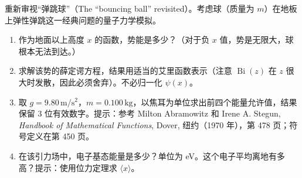 \begin{question}
重新审视“弹跳球”（The ``bouncing ball'' revisited）。考虑球（质量为 $m$）在地板上弹性弹跳这一经典问题的量子力学模拟。
\begin{enumerate}
\item 作为地面以上高度 $x$ 的函数，势能是多少？（对于负 $x$ 值，势是无限大，球根本无法到达。）
\item 求解该势的薛定谔方程，结果用适当的艾里函数表示（注意 $\operatorname{Bi}(z)$ 在 $z$ 很大时发散，因此必须舍弃）。不必归一化 $\psi(x)$。
\item 取 $g=9.80\,\mathrm{m/s^2}$，$m=0.100\,\mathrm{kg}$，以焦耳为单位求出前四个能量允许值，结果保留 3 位有效数字。提示：参考 Milton Abramowitz 和 Irene A. Stegun, \textit{Handbook of Mathematical Functions}, Dover, 纽约（1970 年），第 478 页；符号定义在第 450 页。
\item 在该引力场中，电子基态能量是多少？单位为 eV。这个电子平均离地有多高？提示：使用位力定理求 $\langle x\rangle$。
\end{enumerate}
\end{question}
